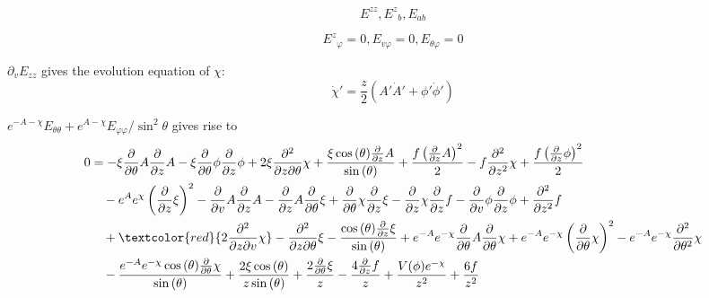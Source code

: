 \documentclass[12pt,a4paper]{ctexart}
\numberwithin{equation}{section}
\begin{document}
\begin{equation}
    E^{zz},{E^z}_b,E_{ab}
\end{equation}

\begin{equation}
    {E^z}_\varphi=0,E_{v\varphi}=0,E_{\theta\varphi}=0
\end{equation}

$\partial_v E_{zz}$ gives the evolution equation of $\chi$:
\begin{equation}
    \dot{\chi}'=\frac{z}{2}(A'\dot{A}'+\phi'\dot{\phi}')
\end{equation}

$e^{-A-\chi}E_{\theta\theta}+e^{A-\chi}E_{\varphi\varphi}/\sin^2\theta$ gives rise to
\begin{equation}
    \begin{aligned}
        0&=- \xi \frac{\partial}{\partial \theta} A \frac{\partial}{\partial z} A - \xi \frac{\partial}{\partial \theta} \phi \frac{\partial}{\partial z} \phi + 2 \xi \frac{\partial^{2}}{\partial z\partial \theta} \chi + \frac{\xi \cos{\left(\theta \right)} \frac{\partial}{\partial z} A}{\sin{\left(\theta \right)}} + \frac{f \left(\frac{\partial}{\partial z} A\right)^{2}}{2} - f \frac{\partial^{2}}{\partial z^{2}} \chi + \frac{f \left(\frac{\partial}{\partial z} \phi\right)^{2}}{2}\\
        &\quad- e^{A} e^{\chi} \left(\frac{\partial}{\partial z} \xi\right)^{2} - \frac{\partial}{\partial v} A \frac{\partial}{\partial z} A - \frac{\partial}{\partial z} A \frac{\partial}{\partial \theta} \xi + \frac{\partial}{\partial \theta} \chi \frac{\partial}{\partial z} \xi - \frac{\partial}{\partial z} \chi \frac{\partial}{\partial z} f - \frac{\partial}{\partial v} \phi \frac{\partial}{\partial z} \phi + \frac{\partial^{2}}{\partial z^{2}} f\\
        &\quad+ \textcolor{red}{2 \frac{\partial^{2}}{\partial z\partial v} \chi} - \frac{\partial^{2}}{\partial z\partial \theta} \xi - \frac{\cos{\left(\theta \right)} \frac{\partial}{\partial z} \xi}{\sin{\left(\theta \right)}} + e^{- A} e^{- \chi} \frac{\partial}{\partial \theta} A \frac{\partial}{\partial \theta} \chi + e^{- A} e^{- \chi} \left(\frac{\partial}{\partial \theta} \chi\right)^{2} - e^{- A} e^{- \chi} \frac{\partial^{2}}{\partial \theta^{2}} \chi\\
        &\quad- \frac{e^{- A} e^{- \chi} \cos{\left(\theta \right)} \frac{\partial}{\partial \theta} \chi}{\sin{\left(\theta \right)}} + \frac{2 \xi \cos{\left(\theta \right)}}{z \sin{\left(\theta \right)}} + \frac{2 \frac{\partial}{\partial \theta} \xi}{z} - \frac{4 \frac{\partial}{\partial z} f}{z} + \frac{V{\left(\phi \right)} e^{- \chi}}{z^{2}} + \frac{6 f}{z^{2}}
    \end{aligned}
\end{equation}
\end{document}
